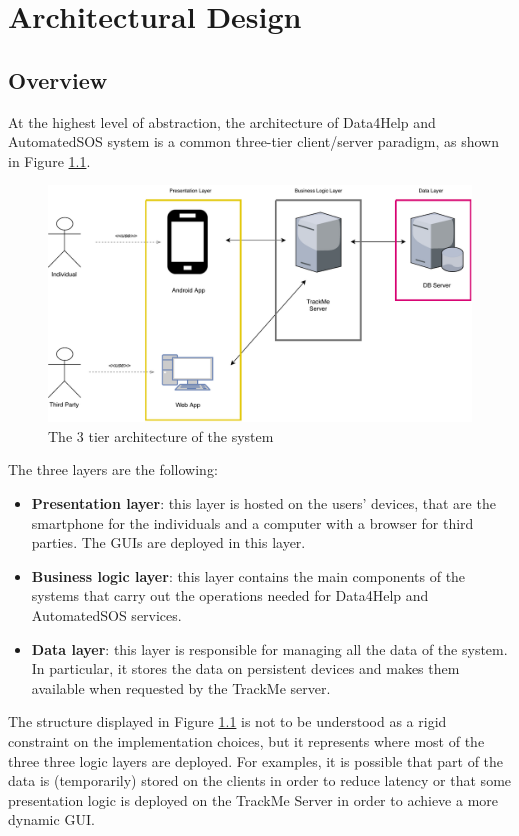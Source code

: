 \chapter{Architectural Design}\label{c:arch}

\section{Overview}

At the highest level of abstraction, the architecture of Data4Help and AutomatedSOS system is a common three-tier client/server paradigm, as shown in Figure \ref{f:3tier}.





\begin{figure}[H]
\centering
\includegraphics[scale=0.65]{resources/overview}
\caption{The 3 tier architecture of the system}\label{f:3tier}
\end{figure}
\noindent
The three layers are the following:

\begin{itemize}
\item \textbf{Presentation layer}: this layer is hosted on the users' devices, that are the smartphone for the individuals and a computer with a browser for third parties.
The GUIs are deployed in this layer.
\item \textbf{Business logic layer}: this layer contains the main components of the systems that carry out the operations needed for Data4Help and AutomatedSOS services.
\item \textbf{Data layer}: this layer is responsible for managing all the data of the system. 
In particular, it stores the data on persistent devices and makes them available when requested by the TrackMe server.
\end{itemize}
The structure displayed in Figure \ref{f:3tier} is not to be understood as a rigid constraint on the implementation choices, but it represents where most of the three three logic layers are deployed.
For examples, it is possible that part of the data is (temporarily) stored on the clients in order to reduce latency or that some presentation logic is deployed on the TrackMe Server in order to achieve a more dynamic GUI.





